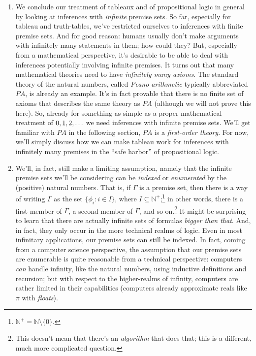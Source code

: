 	\begin{enumerate}[\thesection.1]

		\item We conclude our treatment of tableaux and of propositional logic in general by looking at inferences with \emph{infinite} premise sets. So far, especially for tableau and truth-tables, we've restricted ourselves to inferences with finite premise sets. And for good reason: humans usually don't make arguments with infinitely many statements in them; how could they? But, especially from a mathematical perspective, it's desirable to be able to deal with inferences potentially involving infinite premises. It turns out that many mathematical theories need to have \emph{infinitely many axioms}. The standard theory of the natural numbers, called \emph{Peano arithmetic} typically abbreviated $PA$, is already an example. It's in fact provable that there is no finite set of axioms that describes the same theory as $PA$ (although we will not prove this here). So, already for something as simple as a proper mathematical treatment of $0,1,2,\mathellipsis$ we need inferences with infinite premise sets. We'll get familiar with $PA$ in the following section, $PA$ is a \emph{first-order theory}. For now, we'll simply discuss how we can make tableau work for inferences with infinitely many premises in the ``safe harbor'' of propositional logic.
		
		\item We'll, in fact, still make a limiting assumption, namely that the infinite premise sets we'll be considering can be \emph{indexed} or \emph{enumerated} by the (positive) natural numbers. That is, if $\Gamma$ is a premise set, then there is a way of writing $\Gamma$ as the set $\{\phi_i:i\in I\}$, where $I\subseteq\mathbb{N}^+$;\footnote{$\mathbb{N}^+=\mathbb{N}\setminus\{0\}$.} in other words, there is a first member of $\Gamma$, a second member of $\Gamma$, and so on.\footnote{This doesn't mean that there's an \emph{algorithm} that does that; this is a different, much more complicated question.}  It might be surprising to learn that there are actually infinite sets of formulas \emph{bigger than that}. And, in fact, they only occur in the more technical realms of logic. Even in most infinitary applications, our premise sets can still be indexed. In fact, coming from a computer science perspective, the assumption that our premise sets are enumerable is quite reasonable from a technical perspective: computers \emph{can} handle infinity, like the natural numbers, using inductive definitions and recursion; but with respect to the higher-realms of infinity, computers are rather limited in their capabilities (computers already approximate reals like $\pi$ with \emph{floats}).
		

\end{enumerate}
